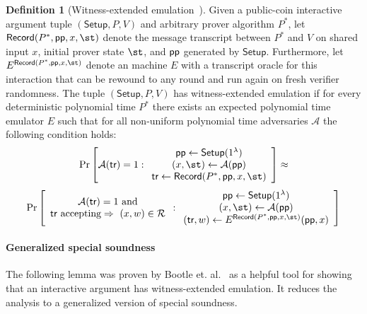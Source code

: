 \documentclass{article}
\theoremstyle{definition}
\newtheorem{definition}{Definition}
\newcommand{\alaninline}[1]{{\todo[color=blue!20!white, inline]{Alan: #1}}}
\newcommand{\alaninline}[1]{}
\begin{document}
\begin{definition}[Witness-extended emulation~\cite{EC:GroIsh08}]\label{def:wee}
Given a public-coin interactive argument tuple $(\textsf{Setup}, P, V)$ and arbitrary prover algorithm $P^*$, let $\textsf{Record}(P^*, \params, x, \st)$ denote the message transcript between $P^*$ and $V$ on shared input $x$, initial prover state $\st$, and $\textsf{pp}$ generated by $\textsf{Setup}$. Furthermore, let $E^{\textsf{Record}(P^*, \params, x, \st)}$ denote an machine $E$ with a transcript oracle for this interaction that can be rewound to any round and run again on fresh verifier randomness. The tuple $(\textsf{Setup}, P, V)$ has witness-extended emulation if for every deterministic polynomial time $P^*$ there exists an expected polynomial time emulator $E$ such that for all non-uniform polynomial time adversaries $\mathcal{A}$ the following condition holds: 
\[
\Pr \left[
\mathcal{A}(\textsf{tr}) = 1
:
\begin{array}{c}
             \params \leftarrow \textsf{Setup}(1^\lambda) \\
             (x, \st) \leftarrow \mathcal{A}(\params) \\
             \textsf{tr} \leftarrow \textsf{Record}(P^*, \params, x, \st)
\end{array} 
\right] \approx
\]
\[
\Pr \left[
\begin{array}{c} 
\mathcal{A}(\textsf{tr}) = 1 \ \text{and} \\ 
\text{\textsf{tr} accepting} \Rightarrow \ (x, w) \in \mathcal{R}
\end{array} 
:
\begin{array}{c}
             \params \leftarrow \textsf{Setup}(1^\lambda) \\
             (x, \st) \leftarrow \mathcal{A}(\params) \\
(\textsf{tr}, w) \leftarrow E^{\textsf{Record}(P^*, \params, x, \st)}(\params, x)
\end{array}
\right]
\]

\end{definition}


\paragraph{Generalized special soundness} The following lemma was proven by Bootle et. al.~\cite{EC:BCCGP16} as a helpful tool for showing that an interactive argument has witness-extended emulation. It reduces the analysis to a generalized version of special soundness. 
\end{document}
